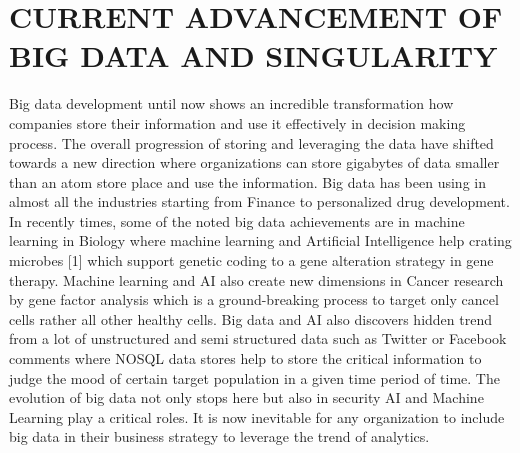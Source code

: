 \documentclass{sig-alternate}
\begin{document}
\section{CURRENT ADVANCEMENT OF 
\\BIG DATA AND  SINGULARITY }
Big data development until now shows an incredible transformation how companies store their information and use it effectively in decision making process. The overall progression of storing and leveraging the data have shifted towards a new direction where organizations can store gigabytes of data smaller than an atom store place and use the information. Big data has been using in almost all the industries starting from Finance to personalized drug development. In recently times, some of the noted big data achievements are in machine learning in Biology where machine learning and Artificial Intelligence help crating microbes [1] which support genetic coding to a gene alteration strategy in gene therapy. Machine learning and AI also create new dimensions in Cancer research by gene factor analysis which is a ground-breaking process to target only cancel cells rather all other healthy cells. Big data and AI also discovers hidden trend from a lot of unstructured and semi structured data such as Twitter or Facebook comments where NOSQL data stores help to store the critical information to judge the mood of certain target population in a given time period of time. The evolution of big data not only stops here but also in security AI and Machine Learning play a critical roles. It is now inevitable for any organization to include big data in their business strategy to leverage the trend of analytics.
\end{document}
